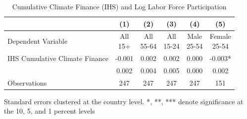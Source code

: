 \begin{table}[htbp]\centering
\def\sym#1{\ifmmode^{#1}\else\(^{#1}\)\fi}
\caption{Cumulative Climate Finance (IHS) and Log Labor Force Participation}
\begin{tabular}{l*{5}{c}}
\toprule
&\multicolumn{1}{c}{(1)}   &\multicolumn{1}{c}{(2)}   &\multicolumn{1}{c}{(3)}   &\multicolumn{1}{c}{(4)} & \multicolumn{1}{c}{(5)}   \\ \midrule Dependent Variable & \shortstack{All \\ 15+} & \shortstack{All \\ 55-64} & \shortstack{All \\ 15-24} & \shortstack{Male \\ 25-54} & \shortstack{Female \\ 25-54} \\ \midrule
IHS Cumulative Climate Finance&      -0.001   &       0.002   &       0.002   &       0.000   &      -0.003*  \\
            &       0.002   &       0.004   &       0.005   &       0.000   &       0.002   \\
\midrule
Observations&         247   &         247   &         247   &         247   &         151   \\
\bottomrule \end{tabular} \begin{center} \begin{minipage}{0.7\textwidth} \footnotesize\footnotesize  \centering Standard errors clustered at the country level. *, **, *** denote significance at the 10, 5, and 1 percent levels \end{minipage} \end{center} \end{table}
